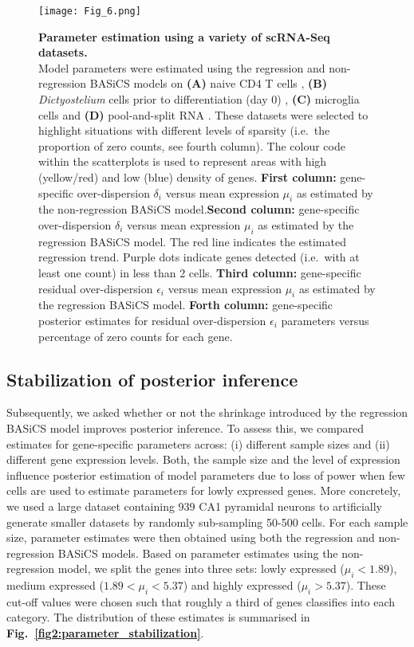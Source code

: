 \begin{figure}[!h]
\centering
\texttt{[image: Fig\_6.png]}
\caption[Parameter estimation using a variety of scRNA-Seq datasets]{\textbf{Parameter estimation using a variety of scRNA-Seq datasets.}\\
Model parameters were estimated using the regression and non-regression BASiCS models on \textbf{(A)} naive CD4\plus{} T cells \citep{Martinez-jimenez2017}, \textbf{(B)} \textit{Dictyostelium} cells prior to differentiation (day 0) \citep{Antolovic2017}, \textbf{(C)} microglia cells \citep{Zeisel2015} and \textbf{(D)} pool-and-split RNA \citep{Grun2014}. These datasets were selected to highlight situations with different levels of sparsity (i.e.~the proportion of zero counts, see fourth column). The colour code within the scatterplots is used to represent areas with high (yellow/red) and low (blue) density of genes. \textbf{First column:} gene-specific over-dispersion $\delta_i$ versus mean expression $\mu_i$ as estimated by the non-regression BASiCS model.\textbf{Second column:} gene-specific over-dispersion $\delta_i$ versus mean expression $\mu_i$ as estimated by the regression BASiCS model. The red line indicates the estimated regression trend. Purple dots indicate genes detected (i.e.~with at least one count) in less than 2 cells. \textbf{Third column:} gene-specific residual over-dispersion $\epsilon_i$ versus mean expression $\mu_i$ as estimated by the regression BASiCS model. \textbf{Forth column:} gene-specific posterior estimates for residual over-dispersion $\epsilon_i$ parameters versus percentage of zero counts for each gene.\\}
\label{fig2:datasets}
\end{figure}

\newpage

\subsection{Stabilization of posterior inference}

Subsequently, we asked whether or not the shrinkage introduced by the regression BASiCS model improves posterior inference. To assess this, we compared estimates for gene-specific parameters across: (i) different sample sizes and (ii) different gene expression levels. Both, the sample size and the level of expression influence posterior estimation of model parameters due to loss of power when few cells are used to estimate parameters for lowly expressed genes. More concretely, we used a large dataset containing 939 CA1 pyramidal neurons \citep{Zeisel2015} to artificially generate smaller datasets by randomly sub-sampling 50-500 cells. For each sample size, parameter estimates were then obtained using both the regression and non-regression BASiCS models. 
Based on parameter estimates using the non-regression model, we split the genes into three sets: lowly expressed ($\mu_i<1.89$), medium expressed ($1.89<\mu_i<5.37$) and highly expressed ($\mu_i>5.37$). These cut-off values were chosen such that roughly a third of genes classifies into each category. The distribution of these estimates is summarised in \textbf{Fig.~\ref{fig2:parameter_stabilization}}. \\

